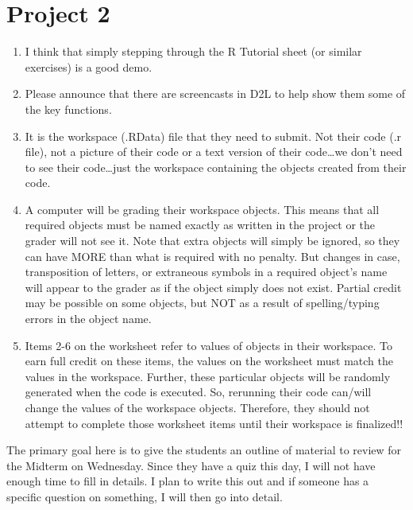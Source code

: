 \documentclass{article}
\begin{document}
\newpage

\section*{Project 2}

\begin{enumerate}

    \item I think that simply stepping through the R Tutorial sheet (or similar exercises) is a good demo.
    
    \item Please announce that there are screencasts in D2L to help show them some of the key functions.
    
    \item It is the workspace (.RData) file that they need to submit. Not their code (.r file), not a picture of their code or a text version of their code\ldots we don’t need to see their code\ldots just the workspace containing the objects created from their code.
    
    \item A computer will be grading their workspace objects. This means that all required objects must be named exactly as written in the project or the grader will not see it. Note that extra objects will simply be ignored, so they can have MORE than what is required with no penalty. But changes in case, transposition of letters, or extraneous symbols in a required object’s name will appear to the grader as if the object simply does not exist. Partial credit may be possible on some objects, but NOT as a result of spelling/typing errors in the object name.
    
    \item Items 2-6 on the worksheet refer to values of objects in their workspace. To earn full credit on these items, the values on the worksheet must match the values in the workspace. Further, these particular objects will be randomly generated when the code is executed. So, rerunning their code can/will change the values of the workspace objects. Therefore, they should not attempt to complete those worksheet items until their workspace is finalized!!
    
\end{enumerate}

\newpage


The primary goal here is to give the students an outline of material to review for the Midterm on Wednesday. Since they have a quiz this day, I will not have enough time to fill in details. I plan to write this out and if someone has a specific question on something, I will then go into detail.
\end{document}
